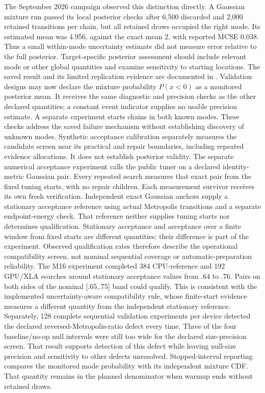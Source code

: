 The September 2026 campaign observed this distinction directly. A Gaussian
mixture run passed its local posterior checks after 6,500 discarded and 2,000
retained transitions per chain, but all retained draws occupied the right mode.
Its estimated mean was 4.956, against the exact mean 2, with reported MCSE 0.038.
Thus a small within-mode uncertainty estimate did not measure error relative
to the full posterior. Target-specific posterior assessment should include
relevant mode or other global quantities and examine sensitivity to starting
locations. The saved result and its limited replication evidence are documented
in .
Validation designs may now declare the mixture probability $P(x<0)$ as a
monitored posterior mean. It receives the same diagnostic and precision checks
as the other declared quantities; a constant event indicator supplies no usable
precision estimate. A separate experiment starts chains in both known modes.
These checks address the saved failure mechanism without establishing discovery
of unknown modes. Synthetic acceptance calibration separately measures the
candidate screen near its practical and repair boundaries, including repeated
evidence allocations. It does not establish posterior validity.
The separate numerical acceptance experiment calls the public tuner on a
declared identity-metric Gaussian pair. Every repeated search measures that
exact pair from the fixed tuning starts, with no repair children. Each
measurement survivor receives its own fresh verification. Independent exact
Gaussian anchors supply a stationary acceptance
reference using actual Metropolis transitions and a separate endpoint-energy
check. That reference neither supplies tuning starts nor determines qualification.
Stationary acceptance and acceptance over a finite window from fixed starts
are different quantities; their difference is part of the experiment.
Observed qualification rates therefore describe the operational compatibility
screen, not nominal sequential coverage or automatic-preparation reliability.
The M16 experiment completed 384 CPU-reference and 192 GPU/XLA searches around
stationary acceptance values from .64 to .76. Pairs on both sides of the
nominal [.65,.75] band could qualify. This is consistent with the implemented
uncertainty-aware compatibility rule, whose finite-start evidence measures a
different quantity from the independent stationary reference. Separately, 128
complete sequential validation experiments per device detected the declared
reversed-Metropolis-ratio defect every time. Three of the four baseline/no-op
null intervals were still too wide for the declared size-precision screen.
That result supports detection of this defect while leaving null-size
precision and sensitivity to other defects unresolved.
Stopped-interval reporting compares the monitored mode probability with its
independent mixture CDF. That quantity remains in the planned denominator when
warmup ends without retained draws.

